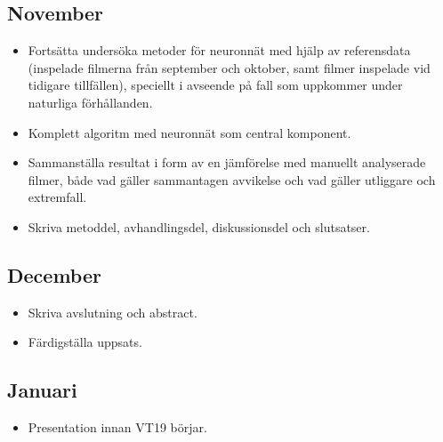 \documentclass[a4paper,12pt]{article}
\begin{document}
\subsection*{November}
\begin{itemize}
  \item Fortsätta undersöka metoder för neuronnät med hjälp av referensdata
    (inspelade filmerna från september och oktober, samt filmer inspelade
    vid tidigare tillfällen), speciellt i avseende på fall som
    uppkommer under naturliga förhållanden.
  \item Komplett algoritm med neuronnät som central komponent.
  \item Sammanställa resultat i form av en jämförelse med manuellt
    analyserade filmer, både vad gäller sammantagen avvikelse och vad
    gäller utliggare och extremfall.
  \item Skriva metoddel, avhandlingsdel, diskussionsdel och slutsatser.
\end{itemize}

\subsection*{December}
\begin{itemize}
  \item Skriva avslutning och abstract.
  \item Färdigställa uppsats.
\end{itemize}

\subsection*{Januari}
\begin{itemize}
  \item Presentation innan VT19 börjar.
\end{itemize}

\printbibliography{}
\end{document}

